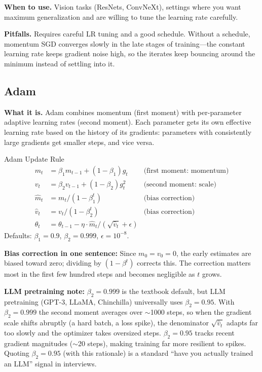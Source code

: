 \textbf{When to use.} Vision tasks (ResNets, ConvNeXt), settings where you want maximum generalization and are willing to tune the learning rate carefully.

\textbf{Pitfalls.} Requires careful LR tuning and a good schedule. Without a schedule, momentum SGD converges slowly in the late stages of training---the constant learning rate keeps gradient noise high, so the iterates keep bouncing around the minimum instead of settling into it.

\subsection{Adam}

\textbf{What it is.} Adam combines momentum (first moment) with per-parameter adaptive learning rates (second moment). Each parameter gets its own effective learning rate based on the history of its gradients: parameters with consistently large gradients get smaller steps, and vice versa.

\begin{mathresult}{Adam Update Rule}
\begin{align}
m_t &= \beta_1 m_{t-1} + (1 - \beta_1) g_t & \text{(first moment: momentum)} \\
v_t &= \beta_2 v_{t-1} + (1 - \beta_2) g_t^2 & \text{(second moment: scale)} \\
\hat{m}_t &= m_t / (1 - \beta_1^t) & \text{(bias correction)} \\
\hat{v}_t &= v_t / (1 - \beta_2^t) & \text{(bias correction)} \\
\theta_t &= \theta_{t-1} - \eta \cdot \hat{m}_t / (\sqrt{\hat{v}_t} + \epsilon)
\end{align}
Defaults: $\beta_1 = 0.9$, $\beta_2 = 0.999$, $\epsilon = 10^{-8}$.
\end{mathresult}

\textbf{Bias correction in one sentence:} Since $m_0 = v_0 = 0$, the early estimates are biased toward zero; dividing by $(1 - \beta^t)$ corrects this. The correction matters most in the first few hundred steps and becomes negligible as $t$ grows.

\textbf{LLM pretraining note:} $\beta_2 = 0.999$ is the textbook default, but LLM pretraining (GPT-3, LLaMA, Chinchilla) universally uses $\beta_2 = 0.95$. With $\beta_2 = 0.999$ the second moment averages over $\sim$1000 steps, so when the gradient scale shifts abruptly (a hard batch, a loss spike), the denominator $\sqrt{\hat{v}_t}$ adapts far too slowly and the optimizer takes oversized steps. $\beta_2 = 0.95$ tracks recent gradient magnitudes ($\sim$20 steps), making training far more resilient to spikes. Quoting $\beta_2 = 0.95$ (with this rationale) is a standard ``have you actually trained an LLM'' signal in interviews.


